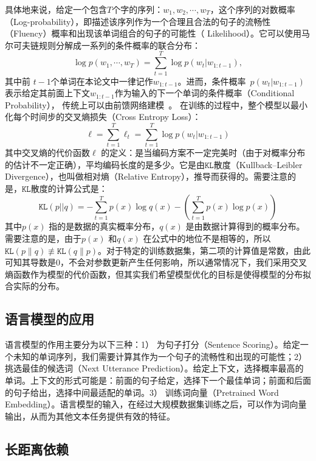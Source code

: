 具体地来说，给定一个包含$T$个字的序列：$w_1,w_2,\cdots,w_T$，这个序列的对数概率（Log-probability），即描述该序列作为一个合理且合法的句子的流畅性（Fluency）概率和出现该单词组合的句子的可能性（ Likelihood）。它可以使用马尔可夫链规则分解成一系列的条件概率的联合分布：
\begin{equation}
\label{laguage_model}
 \log p(w_1,\cdots, w_T ) = \sum_{t=1}^T \log p(w_t | w_{1:t-1}),
\end{equation}
其中前 $t-1$个单词在本论文中一律记作$w_ {1:t-1}$。进而，条件概率~$p(w_t | w_ {1:t-1})$表示给定其前面上下文$w_ {1:t-1} $作为输入的下一个单词的条件概率（Conditional Probability）， 传统上可以由前馈网络建模~。 在训练的过程中，整个模型以最小化每个时间步的交叉熵损失（Cross Entropy Loss）：
\begin{equation}\label{equ:losses}
  \ell=\sum_{t=1}^{T}\ell_t=\sum_{t=1}^{T}\log p(w_t | w_{1:t-1})
\end{equation}
其中交叉熵的代价函数$\ell$ 的定义：是当编码方案不一定完美时（由于对概率分布的估计不一定正确），平均编码长度的是多少。它是由$ \texttt{KL}$散度（Kullback–Leibler Divergence），也叫做相对熵（Relative Entropy），推导而获得的。需要注意的是，$  \texttt{KL}   $散度的计算公式是：
\begin{equation}\label{equ:losses}
  \texttt{KL}(p||q)=-\sum_{t=1}^{T}p(x)\log q(x) - (\sum_{t=1}^{T}p(x)\log p(x))
\end{equation}
其中$p(x)$ 指的是数据的真实概率分布，$q(x)$ 是由数据计算得到的概率分布。需要注意的是，由于$p(x)$ 和$q(x)$ 在公式中的地位不是相等的，所以$   \texttt{KL} (p\parallel q)\not\equiv  \texttt{KL}  (q\parallel p)$。对于特定的训练数据集，第二项的计算值是常数，由此可知其导数是0，不会对参数更新产生任何影响，所以通常情况下，我们采用交叉熵函数作为模型的代价函数，但其实我们希望模型优化的目标是使得模型的分布拟合实际的分布。
\subsection{语言模型的应用}
语言模型的作用主要分为以下三种：1） 为句子打分（Sentence Scoring）。给定一个未知的单词序列，我们需要计算其作为一个句子的流畅性和出现的可能性；2） 挑选最佳的候选词（Next Utterance Prediction）。给定上下文，选择概率最高的单词。上下文的形式可能是：前面的句子给定，选择下一个最佳单词；前面和后面的句子给出，选择中间最适配的单词。3） 训练词向量（Pretrained Word Embedding）。语言模型的输入，在经过大规模数据集训练之后，可以作为词向量输出，从而为其他文本任务提供有效的特征。

\subsection{长距离依赖}

